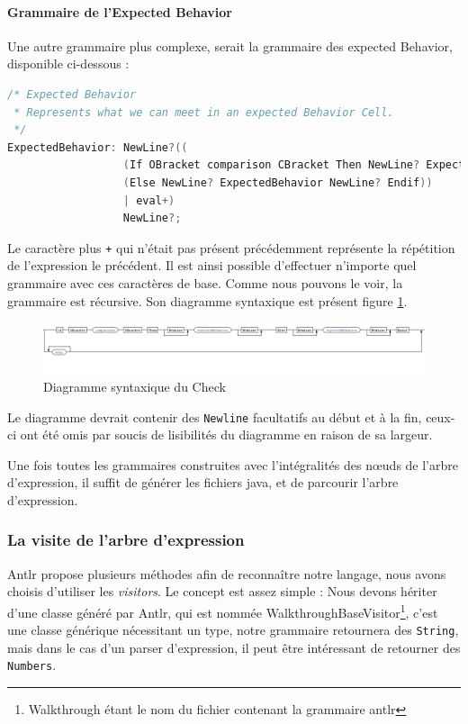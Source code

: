 		\paragraph{Grammaire de l'Expected Behavior}
		Une autre grammaire plus complexe, serait la grammaire des expected Behavior, disponible ci-dessous : 
\begin{lstlisting}[caption=Grammaire Check, numbers=none, language=C]
/* Expected Behavior 
 * Represents what we can meet in an expected Behavior Cell.
 */
ExpectedBehavior: NewLine?((
                  (If OBracket comparison CBracket Then NewLine? ExpectedBehavior NewLine?)
                  (Else NewLine? ExpectedBehavior NewLine? Endif))
                  | eval+)
                  NewLine?;
\end{lstlisting}
Le caractère plus \texttt{+} qui n'était pas présent précédemment représente la répétition de l'expression le précédent. Il est ainsi possible d'effectuer n'importe quel grammaire avec ces caractères de base. Comme nous pouvons le voir, la grammaire est récursive. Son diagramme syntaxique est présent figure \ref{fig:diagSynEB}.
\begin{figure}[H]
	\centering
		\hspace*{-40px}
	\includegraphics[width=20cm]{contents/images/expectedBehaviorGrammar.jpg}
	\caption{Diagramme syntaxique du Check}
	\label{fig:diagSynEB}
\end{figure}
\begin{remarque}
Le diagramme devrait contenir des \texttt{Newline} facultatifs au début et à la fin, ceux-ci ont été omis par soucis de lisibilités du diagramme en raison de sa largeur.
\end{remarque}

Une fois toutes les grammaires construites avec l'intégralités des n\oe{}uds de l'arbre d'expression, il suffit de générer les fichiers java, et de parcourir l'arbre d'expression.

	\subsubsection{La visite de l'arbre d'expression}
	Antlr propose plusieurs méthodes afin de reconnaître notre langage, nous avons choisis d'utiliser les \textit{visitors}. Le concept est assez simple : Nous devons hériter d'une classe généré par Antlr, qui est nommée WalkthroughBaseVisitor\footnote{Walkthrough étant le nom du fichier contenant la grammaire antlr}, c'est une classe générique nécessitant un type, notre grammaire retournera des \texttt{String}, mais dans le cas d'un parser d'expression, il peut être intéressant de retourner des \texttt{Numbers}.


